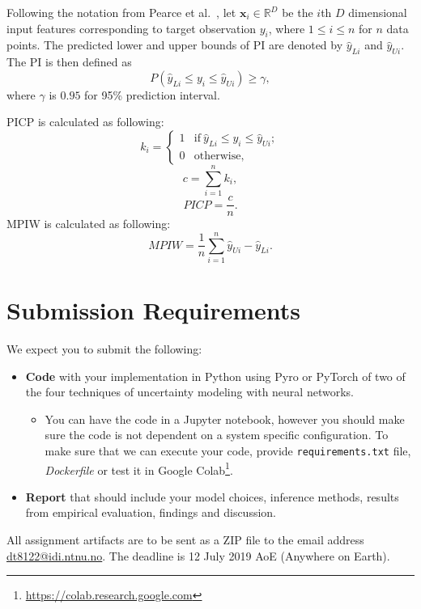 \documentclass[a4paper, 12pt]{article}
\begin{document}
Following the notation from Pearce et al.~\cite{pmlr-v80-pearce18a},  let $\mathbf{x}_{i} \in
\mathbb{R}^{D}$ be the $i$th $D$ dimensional input features corresponding to target observation
$y_i$, where $1 \leq i \leq n$ for $n$ data points.
The predicted lower and upper bounds of PI are denoted by $\hat{y}_{Li}$ and $\hat{y}_{Ui}$. The PI
is then defined as
%
\begin{equation*}
P\left(\hat{y}_{L i} \leq y_{i} \leq \hat{y}_{U i}\right) \geq \gamma,
\end{equation*}
%
where $\gamma$ is $0.95$ for 95\% prediction interval.

\noindent
PICP is calculated as following:
%
\begin{equation*}
k_i =
\begin{cases}
  1 & \text{if}\ \hat{y}_{Li} \leq y_{i} \leq \hat{y}_{Ui}; \\
  0 & \text{otherwise},
\end{cases}
\end{equation*}
%
\begin{equation*}
c = \sum_{i=1}^{n} k_i,
\end{equation*}
%
\begin{equation*}
PICP = \frac{c}{n}.
\end{equation*}
%
\noindent
MPIW is calculated as following:
%
\begin{equation*}
MPIW = \frac{1}{n}\sum_{i=1}^{n} \hat{y}_{Ui} - \hat{y}_{Li}.
\end{equation*}


\section{Submission Requirements}
\label{sec:SubmissionRequirements}

We expect you to submit the following:

\begin{itemize}
	\item {\bf Code} with your implementation in Python using Pyro or PyTorch of two of the four
	techniques of uncertainty modeling with neural networks.
	    \begin{itemize}
	        \item You can have the code in a Jupyter notebook, however you should make sure the code is
	        not dependent on a system specific configuration. To make sure that we can execute your
	        code, provide \texttt{requirements.txt} file, \textit{Dockerfile} or test it in Google
	        Colab\footnote{\url{https://colab.research.google.com}}.
	    \end{itemize}
	\item {\bf Report} that should include your model choices, inference methods, results from
	empirical evaluation, findings and discussion.
\end{itemize}

\noindent
All assignment artifacts are to be sent as a ZIP file to the email address \url{dt8122@idi.ntnu.no}.
The deadline is 12 July 2019 AoE (Anywhere on Earth).



\end{document}
